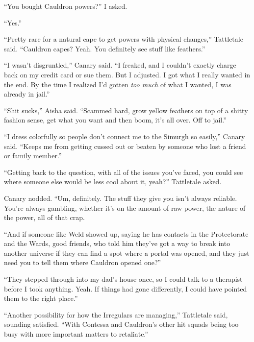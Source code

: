 ``You bought Cauldron powers?'' I asked.



``Yes.''



``Pretty rare for a natural cape to get powers with physical changes,'' Tattletale said.  ``Cauldron capes?  Yeah.  You definitely see stuff like feathers.''



``I wasn't disgruntled,'' Canary said.  ``I freaked, and I couldn't exactly charge back on my credit card or sue them.  But I adjusted.  I got what I really wanted in the end.  By the time I realized I'd gotten \emph{too much }of what I wanted, I was already in jail.''



``Shit sucks,'' Aisha said.  ``Scammed hard, grow yellow feathers on top of a shitty fashion sense, get what you want and then boom, it's all over.  Off to jail.''



``I dress colorfully so people don't connect me to the Simurgh so easily,'' Canary said.  ``Keeps me from getting cussed out or beaten by someone who lost a friend or family member.''



``Getting back to the question, with all of the issues you've faced, you could see where someone else would be less cool about it, yeah?'' Tattletale asked.



Canary nodded.  ``Um, definitely.  The stuff they give you isn't always reliable.  You're always gambling, whether it's on the amount of raw power, the nature of the power, all of that crap.



``And if someone like Weld showed up, saying he has contacts in the Protectorate and the Wards, good friends, who told him they've got a way to break into another universe if they can find a spot where a portal was opened, and they just need you to tell them where Cauldron opened one?''



``They stepped through into my dad's house once, so I could talk to a therapist before I took anything.  Yeah.  If things had gone differently, I could have pointed them to the right place.''



``Another possibility for how the Irregulars are managing,'' Tattletale said, sounding satisfied.  ``With Contessa and Cauldron's other hit squads being too busy with more important matters to retaliate.''



